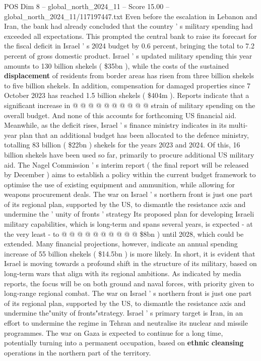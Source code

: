 \begin{textsample}{POS Dim 8 – global\_north\_2024\_11 – Score 15.00 – global\_north\_2024\_11/117197447.txt}
Even before the escalation in Lebanon and Iran, the bank had already concluded that the country ' s military spending had exceeded all expectations.
This prompted the central bank to raise its forecast for the fiscal deficit in Israel ' s 2024 budget by 0.6 percent, bringing the total to 7.2 percent of gross domestic product.
Israel ' s updated military spending this year amounts to 130 billion shekels ( \$35bn ), while the costs of the sustained \textbf{displacement} of residents from border areas has risen from three billion shekels to five billion shekels.
In addition, compensation for damaged properties since 7 October 2023 has reached 1.5 billion shekels ( \$404m ).
Reports indicate that a significant increase in @ @ @ @ @ @ @ @ @ @ strain of military spending on the overall budget.
And none of this accounts for forthcoming US financial aid.
Meanwhile, as the deficit rises, Israel ' s finance ministry indicates in its multi-year plan that an additional budget has been allocated to the defence ministry, totalling 83 billion ( \$22bn ) shekels for the years 2023 and 2024.
Of this, 16 billion shekels have been used so far, primarily to procure additional US military aid.
The Nagel Commission ' s interim report ( the final report will be released by December ) aims to establish a policy within the current budget framework to optimise the use of existing equipment and ammunition, while allowing for weapons procurement deals.
The war on Israel ' s northern front is just one part of its regional plan, supported by the US, to dismantle the resistance axis and undermine the ' unity of fronts ' strategy Its proposed plan for developing Israeli military capabilities, which is long-term and spans several years, is expected - at the very least - to @ @ @ @ @ @ @ @ @ @ \$8bn ) until 2028, which could be extended.
Many financial projections, however, indicate an annual spending increase of 55 billion shekels ( \$14.5bn ) is more likely.
In short, it is evident that Israel is moving towards a profound shift in the structure of its military, based on long-term wars that align with its regional ambitions.
As indicated by media reports, the focus will be on both ground and naval forces, with priority given to long-range regional combat.
The war on Israel ' s northern front is just one part of its regional plan, supported by the US, to dismantle the resistance axis and undermine the"unity of fronts"strategy.
Israel ' s primary target is Iran, in an effort to undermine the regime in Tehran and neutralise its nuclear and missile programmes.
The war on Gaza is expected to continue for a long time, potentially turning into a permanent occupation, based on \textbf{ethnic} \textbf{cleansing} operations in the northern part of the territory.

\end{textsample}
